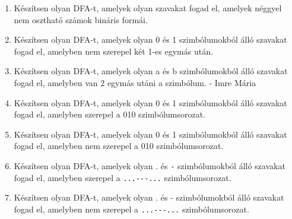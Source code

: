 \documentclass[a4paper]{article}
\begin{document}
\begin{enumerate}
\item Készítsen olyan DFA-t, amelyek olyan szavakat fogad el, amelyek néggyel
nem osztható számok bináris formái.

\item Készítsen olyan DFA-t, amelyek olyan 0 és 1 szimbólumokból álló szavakat
fogad el, amelyben nem szerepel két 1-es egymás után.

\item Készítsen olyan DFA-t, amelyek olyan a és b szimbólumokból álló szavakat
fogad el, amelyben van 2 egymás utáni a szimbólum.
- Imre Mária

\item Készítsen olyan DFA-t, amelyek olyan 0 és 1 szimbólumokból álló szavakat
fogad el, amelyben szerepel a 010 szimbólumsorozat.

\item Készítsen olyan DFA-t, amelyek olyan 0 és 1 szimbólumokból álló szavakat
fogad el, amelyben nem szerepel a 010 szimbólumsorozat.

\item Készítsen olyan DFA-t, amelyek olyan . és \verb|-| szimbólumokból álló szavakat
fogad el, amelyben szerepel a \verb|...---...| szimbólumsorozat.

\item Készítsen olyan DFA-t, amelyek olyan . és - szimbólumokból álló szavakat
fogad el, amelyben nem szerepel a \verb|...---...| szimbólumsorozat.
\end{enumerate}


%
%
%
%
%
%
\end{document}
